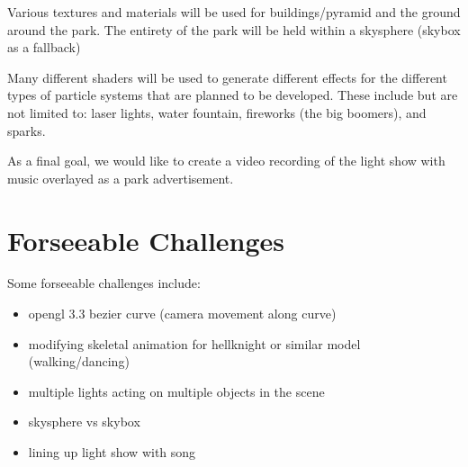\documentclass[titlepage,11pt]{article}
\begin{document}
Various textures and materials will be used for buildings/pyramid and the ground around the park.
The entirety of the park will be held within a skysphere (skybox as a fallback)

Many different shaders will be used to generate different effects for the different types of 
particle systems that are planned to be developed. These include but are not limited to: laser lights,
water fountain, fireworks (the big boomers), and sparks.

As a final goal, we would like to create a video recording of the light show with music overlayed as
a park advertisement.

\section{Forseeable Challenges}
Some forseeable challenges include:
\begin{itemize}
    \item opengl 3.3 bezier curve (camera movement along curve)
    \item modifying skeletal animation for hellknight or similar model (walking/dancing)
    \item multiple lights acting on multiple objects in the  scene
    \item skysphere vs skybox
    \item lining up light show with song
\end{itemize}
\end{document}
